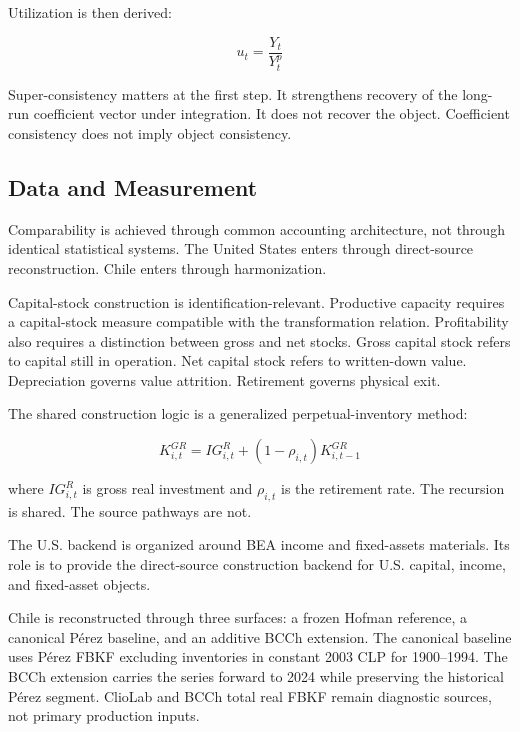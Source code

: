 Utilization is then derived:

\begin{equation}
u_t=\frac{Y_t}{Y_t^p}
\end{equation}

Super-consistency matters at the first step. It strengthens recovery of the long-run coefficient vector under integration. It does not recover the object. Coefficient consistency does not imply object consistency.

\subsection{Data and Measurement}

Comparability is achieved through common accounting architecture, not through identical statistical systems. The United States enters through direct-source reconstruction. Chile enters through harmonization.

Capital-stock construction is identification-relevant. Productive capacity requires a capital-stock measure compatible with the transformation relation. Profitability also requires a distinction between gross and net stocks. Gross capital stock refers to capital still in operation. Net capital stock refers to written-down value. Depreciation governs value attrition. Retirement governs physical exit.

The shared construction logic is a generalized perpetual-inventory method:

\begin{equation}
K^{GR}_{i,t}
=
IG^R_{i,t}
+
(1-\rho_{i,t})K^{GR}_{i,t-1}
\end{equation}

where $IG^R_{i,t}$ is gross real investment and $\rho_{i,t}$ is the retirement rate. The recursion is shared. The source pathways are not.

The U.S. backend is organized around BEA income and fixed-assets materials. Its role is to provide the direct-source construction backend for U.S. capital, income, and fixed-asset objects.

Chile is reconstructed through three surfaces: a frozen Hofman reference, a canonical Pérez baseline, and an additive BCCh extension. The canonical baseline uses Pérez FBKF excluding inventories in constant 2003 CLP for 1900–1994. The BCCh extension carries the series forward to 2024 while preserving the historical Pérez segment. ClioLab and BCCh total real FBKF remain diagnostic sources, not primary production inputs.

